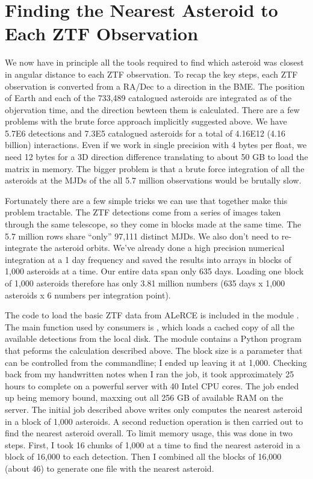 \section{Finding the Nearest Asteroid to Each ZTF Observation}
\label{section_ztf_nearest_ast}
We now have in principle all the tools required to find which asteroid was closest in angular distance to each ZTF observation.
To recap the key steps, each ZTF observation is converted from a RA/Dec to a direction in the BME.
The position of Earth and each of the 733,489 catalogued asteroids are integrated as of the objervation time, and the direction bewteen them is calculated.
There are a few problems with the brute force approach implicitly suggested above.
We have 5.7E6 detections and 7.3E5 catalogued asteroids for a total of 4.16E12 (4.16 billion) interactions.
Even if we work in single precision with 4 bytes per float, we need 12 bytes for a 3D direction difference translating to about 50 GB to load the matrix in memory.
The bigger problem is that a brute force integration of all the asteroids at the MJDs of the all 5.7 million observations would be brutally slow.

Fortunately there are a few simple tricks we can use that together make this problem tractable.
The ZTF detections come from a series of images taken through the same telescope, so they come in blocks made at the same time.
The 5.7 million rows share ``only'' 97,111 distinct MJDs.
We also don't need to re-integrate the asteroid orbits.
We've already done a high precision numerical integration at a 1 day frequency and saved the results into  arrays in blocks of 1,000 asteroids at a time.
Our entire data span only 635 days.  
Loading one block of 1,000 asteroids therefore has only 3.81 million numbers (635 days x 1,000 asteroids x 6 numbers per integration point).

The code to load the basic ZTF data from ALeRCE is included in the module .
The main function used by consumers is , which loads a cached copy of all the available detections from the local disk.
The module  contains a Python program that peforms the calculation described above.
The block size is a parameter that can be controlled from the commandline; I ended up leaving it at 1,000.
Checking back from my handwritten notes when I ran the job, it took approximately 25 hours to complete on a powerful server with 40 Intel CPU cores.
The job ended up being memory bound, maxxing out all 256 GB of available RAM on the server.
The initial job described above writes only computes the nearest asteroid in a block of 1,000 asteroids.
A second reduction operation is then carried out to find the nearest asteroid overall.
To limit memory usage, this was done in two steps.
First, I took 16 chunks of 1,000 at a time to find the nearest asteroid in a block of 16,000 to each detection.
Then I combined all the blocks of 16,000 (about 46) to generate one file with the nearest asteroid.

